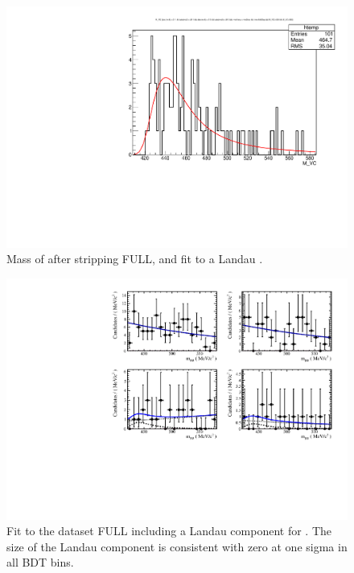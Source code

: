\begin{figure} [htb!]
\begin{center}
\includegraphics[scale=0.6]{figs/landau.pdf}
\caption{Mass of \KSTpi after stripping FULL, and fit to a Landau \pdf. \label{fig:Landau}}
\end{center}
\end{figure}

\begin{figure} [htb!]
\begin{center}
\includegraphics[scale=0.5]{figs/fit_wK3pi.pdf}
\caption{Fit to the dataset FULL including a Landau component for \KLTpi. The size of the Landau component is consistent with zero at one sigma in all BDT bins. \label{fig:fitK3pi}}
\end{center}
\end{figure}


